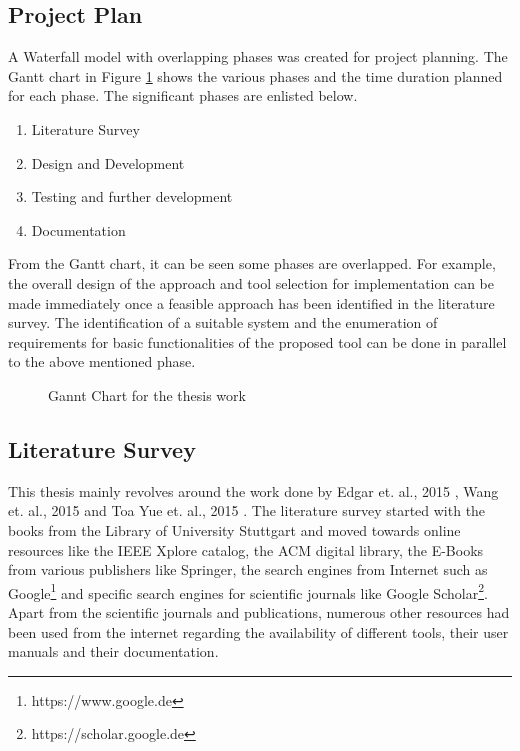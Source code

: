 \subsection{Project Plan}
A Waterfall model with overlapping phases was created for project planning. The Gantt chart in Figure \ref{fig:gc} shows the various phases and the time duration planned for each phase. 
The significant phases are enlisted below.
\begin{enumerate}
\item Literature Survey
\item Design and Development
\item Testing and further development
\item Documentation
\end{enumerate}
From the Gantt chart, it can be seen some phases are overlapped. For example, the overall design of the approach and tool selection for implementation can be made immediately once a feasible approach has been identified in the literature survey. The identification of a suitable system and the enumeration of requirements for basic functionalities of the proposed tool can be done in parallel to the above mentioned phase.
\begin{figure}[htb!]
\centering
{}
\caption{Gannt Chart for the thesis work}
\label{fig:gc}
\end{figure}
\subsection{Literature Survey}
This thesis mainly revolves around the work done by Edgar et. al., 2015 \cite{sarmiento2015mapping}, Wang et. al., 2015 \cite{wang2015automatic} and Toa Yue et. al., 2015 \cite{yue2015rtcm}. The literature survey started with the books from the Library of University Stuttgart and moved towards online resources like the IEEE Xplore catalog, the ACM digital library, the E-Books from various publishers like Springer, the search engines from Internet such as Google\footnote{https://www.google.de} and specific search engines for scientific journals like Google Scholar\footnote{https://scholar.google.de}. Apart from the scientific journals and publications, numerous other resources had been used from the internet regarding the availability of different tools, their user manuals and their documentation.

